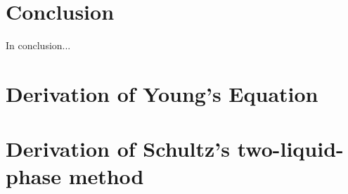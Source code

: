\documentclass[12pt,letterpaper]{report}
\begin{document}


\chapter{Conclusion}
In conclusion...

\newpage
\appendix
\chapter{Derivation of Young's Equation}\label{appendixA}


\chapter{Derivation of Schultz's two-liquid-phase method}\label{appendixB}


\newpage


\end{document}
